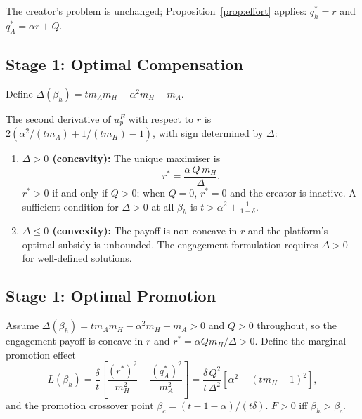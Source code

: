 \documentclass[mnsc,nonblindrev]{informs3_NoOR}
\begin{document}
The creator's problem is unchanged; Proposition~\ref{prop:effort} applies: $q_h^* = r$ and $q_A^* = \alpha r + Q$.
 
\subsection{Stage 1: Optimal Compensation}
 
Define $\Delta(\beta_h) = tm_Am_H - \alpha^2 m_H - m_A$.
 
\begin{proposition}\label{prop:rstar-eng}
The second derivative of $u_p^E$ with respect to $r$ is $2(\alpha^2/(tm_A) + 1/(tm_H) - 1)$, with sign determined by $\Delta$:
\begin{enumerate}
\item[\textup{(a)}] \textbf{$\Delta > 0$ (concavity):} The unique maximiser is
\begin{equation}\label{eq:rstar-eng}
r^* = \frac{\alpha\,Q\,m_H}{\Delta}.
\end{equation}
$r^* > 0$ if and only if $Q > 0$; when $Q = 0$, $r^* = 0$ and the creator is inactive. A sufficient condition for $\Delta > 0$ at all $\beta_h$ is $t > \alpha^2 + \frac{1}{1-\delta}$.
 
\item[\textup{(b)}] \textbf{$\Delta \leq 0$ (convexity):} The payoff is non-concave in $r$ and the platform's optimal subsidy is unbounded. The engagement formulation requires $\Delta > 0$ for well-defined solutions.
\end{enumerate}
\end{proposition}
 
\subsection{Stage 1: Optimal Promotion}
 
Assume $\Delta(\beta_h) = tm_Am_H - \alpha^2 m_H - m_A > 0$ and $Q > 0$ throughout, so the engagement payoff is concave in $r$ and $r^* = \alpha Qm_H/\Delta > 0$. Define the marginal promotion effect
\begin{equation}\label{eq:F-def}
L(\beta_h) = \frac{\delta}{t}\!\left[\frac{(r^*)^2}{m_H^2} - \frac{(q_A^*)^2}{m_A^2}\right] = \frac{\delta\,Q^2}{t\,\Delta^2}\!\left[\alpha^2 - (tm_H - 1)^2\right],
\end{equation}
and the promotion crossover point $\beta_c = (t - 1 - \alpha)/(t\delta)$. $F > 0$ iff $\beta_h > \beta_c$.
 
\end{document}
